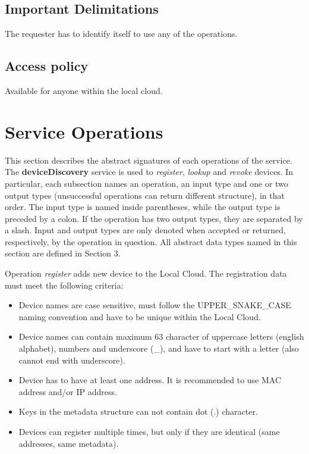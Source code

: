 \documentclass[a4paper]{arrowhead}
\begin{document}
\subsection{Important Delimitations}
\label{sec:delimitations}

The requester has to identify itself to use any of the operations.

\subsection{Access policy}
\label{sec:accesspolicy}

Available for anyone within the local cloud.

\newpage

\section{Service Operations}
\label{sec:functions}

This section describes the abstract signatures of each operations of the service. The \textbf{deviceDiscovery} service is used to \textit{register}, \textit{lookup} and \textit{revoke} devices.
In particular, each subsection names an operation, an input type and one or two output types (unsuccessful operations can return different structure), in that order.
The input type is named inside parentheses, while the output type is preceded by a colon. If the operation has two output types, they are separated by a slash.
Input and output types are only denoted when accepted or returned, respectively, by the operation in question. All abstract data types named in this section are defined in Section 3.

{}

Operation \textit{register} adds new device to the Local Cloud. The registration data must meet the following criteria:

\begin{itemize}
    \item Device names are case sensitive, must follow the UPPER\_SNAKE\_CASE naming convention and have to be unique within the Local Cloud.
    \item Device names can contain maximum 63 character of uppercase letters (english alphabet), numbers and underscore (\_), and have to start with a letter (also cannot end with underscore).
    \item Device has to have at least one address. It is recommended to use MAC address and/or IP address.
    \item Keys in the metadata structure can not contain dot (.) character.
    \item Devices can register multiple times, but only if they are identical (same addresses, same metadata).
\end{itemize}
\end{document}
